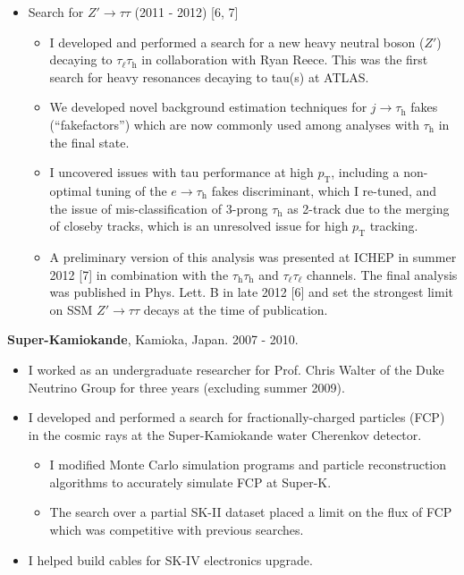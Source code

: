 \documentclass{resume2}
\begin{document}
\begin{resume}
\begin{itemize}
\item Search for $Z' \!\rightarrow\! \tau\tau$ (2011 - 2012) [6, 7]
  \begin{itemize}
  \item I developed and performed a search for a new heavy neutral boson ($Z'$) decaying to $\tau_{\ell}\tau_\text{h}$ in collaboration with Ryan Reece. This was the first search for heavy resonances decaying to tau(s) at ATLAS.
  \item We developed novel background estimation techniques for $j\!\rightarrow\!\tau_\text{h}$ fakes (``fakefactors'') which are now commonly used among analyses with $\tau_\text{h}$ in the final state.
  \item I uncovered issues with tau performance at high $p_{\text{T}}$, including a non-optimal tuning of the $e\!\rightarrow\!\tau_\text{h}$ fakes discriminant, which I re-tuned, and the issue of mis-classification of 3-prong $\tau_\text{h}$ as 2-track due to the merging of closeby tracks, which is an unresolved issue for high $p_{\text{T}}$ tracking.
  \item A preliminary version of this analysis was presented at ICHEP in summer 2012 [7] in combination with the $\tau_\text{h}\tau_\text{h}$ and $\tau_{\ell}\tau_{\ell}$ channels. The final analysis was published in Phys. Lett. B in late 2012 [6] and set the strongest limit on SSM $Z'\!\rightarrow\!\tau\tau$ decays at the time of publication.
  \end{itemize}

\end{itemize}

\pagebreak

\textbf{Super-Kamiokande}, Kamioka, Japan. 2007 - 2010.
\begin{itemize}
\item I worked as an undergraduate researcher for Prof. Chris Walter of the Duke Neutrino Group for three years (excluding summer 2009).
\item I developed and performed a search for fractionally-charged particles (FCP) in the cosmic rays at the Super-Kamiokande water Cherenkov detector.  
  \begin{itemize}
  \item I modified Monte Carlo simulation programs and particle reconstruction algorithms to accurately simulate FCP at Super-K.
  \item The search over a partial SK-II dataset placed a limit on the flux of FCP which was competitive with previous searches.
  \end{itemize}
\item I helped build cables for SK-IV electronics upgrade.
\end{itemize}


\end{resume}
\end{document}
